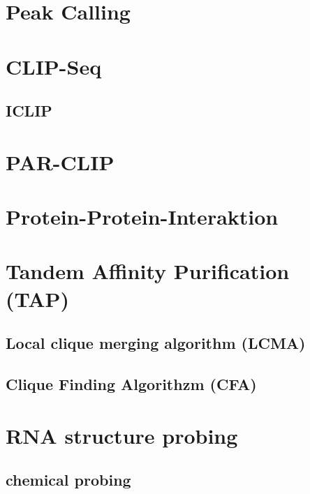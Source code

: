 \documentclass[12pt]{article}
\begin{document}
\section{Peak Calling}

\section{CLIP-Seq}

\subsection{ICLIP}

\section{PAR-CLIP}

\section{Protein-Protein-Interaktion}

\section{Tandem Affinity Purification (TAP)}

\subsection{Local clique merging algorithm (LCMA)}

\subsection{Clique Finding Algorithzm (CFA)}

\section{RNA structure probing}

\subsection{chemical probing}
\end{document}
